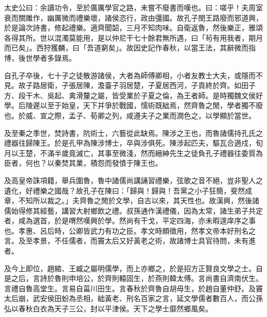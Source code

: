 
\begin{pinyinscope}
太史公曰：余讀功令，至於廣厲學官之路，未嘗不廢書而嘆也。曰：嗟乎！夫周室衰而關雎作，幽厲微而禮樂壞，諸侯恣行，政由彊國。故孔子閔王路廢而邪道興，於是論次詩書，修起禮樂。適齊聞韶，三月不知肉味。自衛返魯，然後樂正，雅頌各得其所。世以混濁莫能用，是以仲尼干七十餘君無所遇，曰「茍有用我者，期月而已矣」。西狩獲麟，曰「吾道窮矣」。故因史記作春秋，以當王法，其辭微而指博，後世學者多錄焉。

自孔子卒後，七十子之徒散游諸侯，大者為師傅卿相，小者友教士大夫，或隱而不見。故子路居衛，子張居陳，澹臺子羽居楚，子夏居西河，子貢終於齊。如田子方、段干木、吳起、禽滑釐之屬，皆受業於子夏之倫，為王者師。是時獨魏文侯好學。后陵遲以至于始皇，天下并爭於戰國，懦術既絀焉，然齊魯之閒，學者獨不廢也。於威、宣之際，孟子、荀卿之列，咸遵夫子之業而潤色之，以學顯於當世。

及至秦之季世，焚詩書，阬術士，六藝從此缺焉。陳涉之王也，而魯諸儒持孔氏之禮器往歸陳王。於是孔甲為陳涉博士，卒與涉俱死。陳涉起匹夫，驅瓦合適戍，旬月以王楚，不滿半歲竟滅亡，其事至微淺，然而縉紳先生之徒負孔子禮器往委質為臣者，何也？以秦焚其業，積怨而發憤于陳王也。

及高皇帝誅項籍，舉兵圍魯，魯中諸儒尚講誦習禮樂，弦歌之音不絕，豈非聖人之遺化，好禮樂之國哉？故孔子在陳曰：「歸與！歸與！吾黨之小子狂簡，斐然成章，不知所以裁之。」夫齊魯之閒於文學，自古以來，其天性也。故漢興，然後諸儒始得修其經藝，講習大射鄉飲之禮。叔孫通作漢禮儀，因為太常，諸生弟子共定者，咸為選首，於是喟然嘆興於學。然尚有干戈，平定四海，亦未暇遑庠序之事也。孝惠、呂后時，公卿皆武力有功之臣。孝文時頗徵用，然孝文帝本好刑名之言。及至孝景，不任儒者，而竇太后又好黃老之術，故諸博士具官待問，未有進者。

及今上即位，趙綰、王臧之屬明儒學，而上亦鄉之，於是招方正賢良文學之士。自是之后，言詩於魯則申培公，於齊則轅固生，於燕則韓太傅。言尚書自濟南伏生。言禮自魯高堂生。言易自菑川田生。言春秋於齊魯自胡毋生，於趙自董仲舒。及竇太后崩，武安侯田蚡為丞相，絀黃老、刑名百家之言，延文學儒者數百人，而公孫弘以春秋白衣為天子三公，封以平津侯。天下之學士靡然鄉風矣。


\end{pinyinscope}
